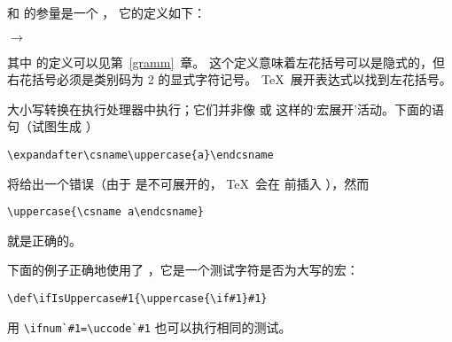 \documentclass{book}
\begin{document}
 和  的参量是一个 ，
它的定义如下：
\begin{Disp}  $\longrightarrow$ \lb
      \end{Disp}
其中  的定义可以见第~\ref{gramm}~章。
这个定义意味着左花括号可以是隐式的，但右花括号必须是类别码为 2 的显式字符记号。
\TeX\ 展开表达式以找到左花括号。

大小写转换在执行处理器中执行；它们并非像 或 
这样的`宏展开'活动。下面的语句（试图生成 ）
\begin{verbatim}
\expandafter\csname\uppercase{a}\endcsname
\end{verbatim}
将给出一个错误（由于  是不可展开的，
\TeX\ 会在  前插入 ），然而
\begin{verbatim}
\uppercase{\csname a\endcsname}
\end{verbatim}
就是正确的。

下面的例子正确地使用了 ，它是一个测试字符是否为大写的宏：
\begin{verbatim}
\def\ifIsUppercase#1{\uppercase{\if#1}#1}
\end{verbatim}
用 \verb>\ifnum`#1=\uccode`#1> 也可以执行相同的测试。
\end{document}
